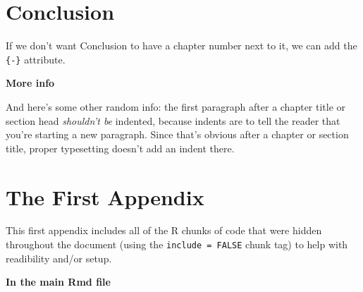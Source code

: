 \documentclass[twoside,12pt,final]{ucthesis-CA2012}
\begin{document}
\begin{ucmainmatter}
\hypertarget{conclusion}{%
\chapter*{Conclusion}\label{conclusion}}

If we don't want Conclusion to have a chapter number next to it, we can add the \texttt{\{-\}} attribute.

\textbf{More info}

And here's some other random info: the first paragraph after a chapter title or section head \emph{shouldn't be} indented, because indents are to tell the reader that you're starting a new paragraph. Since that's obvious after a chapter or section title, proper typesetting doesn't add an indent there.

\appendix

\hypertarget{the-first-appendix}{%
\chapter{The First Appendix}\label{the-first-appendix}}

This first appendix includes all of the R chunks of code that were hidden throughout the document (using the \texttt{include\ =\ FALSE} chunk tag) to help with readibility and/or setup.

\textbf{In the main Rmd file}


\end{ucmainmatter}
\end{document}
